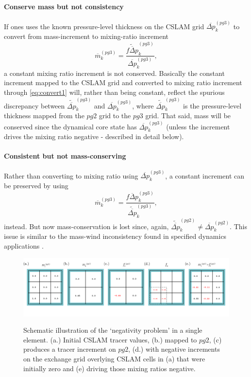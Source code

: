 \paragraph{Conserve mass but not consistency} 
If ones uses the known pressure-level thickness on the CSLAM grid ${\overline{\Delta p}}^{(pg3)}_k$ to convert from mass-increment to mixing-ratio increment
\begin{equation}
\label{eq:convert1}
\overline{m}^{(pg3)}_k=\frac{\widetilde{\overline{f\Delta p}}^{(pg3)}_k}{{\overline{\Delta p}}^{(pg3)}_k},
\end{equation}
a constant mixing ratio increment is not conserved. Basically the constant increment mapped to the CSLAM grid and converted to mixing ratio increment through \eqref{eq:convert1} will, rather than being constant, reflect the spurious discrepancy between $\widetilde{\overline{\Delta p}}^{(pg3)}_k$ and ${\overline{\Delta p}}^{(pg3)}_k$, where $\widetilde{\overline{\Delta p}}^{(pg3)}_k$ is the pressure-level thickness mapped from the $pg2$ grid to the $pg3$ grid. That said, mass will be conserved since the dynamical core state has ${\overline{\Delta p}}^{(pg3)}_k$ (unless the increment drives the mixing ratio negative - described in detail below). 
\paragraph{Consistent but not mass-conserving} 
Rather than converting to mixing ratio using ${\overline{\Delta p}}^{(pg3)}_k$, a constant increment can be preserved by using
\begin{equation}
\overline{m}^{(pg3)}_k=\frac{\overline{f\Delta p}^{(pg3)}_k}{\widetilde{\overline{\Delta p}}^{(pg3)}_k},
\end{equation}
instead. But now mass-conservation is lost since, again, $\widetilde{\overline{\Delta p}}^{(pg2)}_k\ne {\overline{\Delta p}}^{(pg2)}_k$. This issue is similar to the mass-wind inconsistency found in specified dynamics applications \citep[e.g.][]{JKLSBCRE2001QJR,L2009LNCE}. 

\begin{figure}[t]
\begin{center}
\noindent\includegraphics[width=30pc,angle=0]{figs/alg-schematic.png}\\
\end{center}
\caption{Schematic illustration of the `negativity problem' in a single element. (a.) Initial CSLAM tracer values, (b.) mapped to $pg2$, (c) produces a tracer increment on $pg2$, (d.) with negative increments on the exchange grid overlying CSLAM cells in (a) that were initially zero and (e) driving those mixing ratios negative.}
\label{fig:alg-schematic}
\end{figure}
